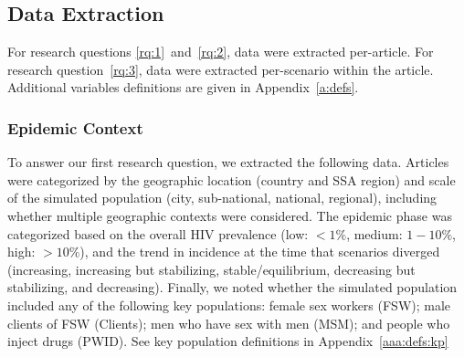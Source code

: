 \subsection{Data Extraction}
\label{ss:meth:data}
For research questions \ref{rq:1}~and~\ref{rq:2}, data were extracted per-article.
For research question~\ref{rq:3}, data were extracted per-scenario within the article.
Additional variables definitions are given in Appendix~\ref{a:defs}.
\subsubsection{Epidemic Context}
\label{sss:meth:context}
To answer our first research question, we extracted the following data.
Articles were categorized by the geographic location (country and SSA region)
and scale of the simulated population (city, sub-national, national, regional),
including whether multiple geographic contexts were considered.
The epidemic phase was categorized based on
the overall HIV prevalence (low: $<1\%$, medium: $1-10\%$, high: $>10\%$),
and the trend in incidence at the time that scenarios diverged
(increasing, increasing but stabilizing, stable/equilibrium,
decreasing but stabilizing, and decreasing).
Finally, we noted whether the simulated population
included any of the following key populations:
female sex workers (FSW);
male clients of FSW (Clients);
men who have sex with men (MSM); and
people who inject drugs (PWID).
See key population definitions in Appendix~\ref{aaa:defs:kp}
